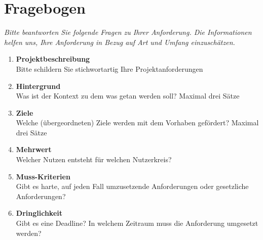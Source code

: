 \section{Fragebogen}
\textit{Bitte beantworten Sie folgende Fragen zu Ihrer Anforderung. Die Informationen helfen uns, Ihre Anforderung in Bezug auf Art und Umfang einzuschätzen. \\
}

\begin{Form}
	\begin{enumerate}

		\item \textbf{Projektbeschreibung} \\
		      Bitte schildern Sie stichwortartig Ihre Projektanforderungen  \\
		      \TextField[charsize=0pt, donotscroll, multiline, width=0.9\textwidth, height=3cm, value={}, name=description]{}

		\item \textbf{Hintergrund} \\
		      Was ist der Kontext zu dem was getan werden soll? Maximal drei Sätze \\
		      \TextField[charsize=0pt, donotscroll, multiline,width=0.9\textwidth, height=3cm, value={}, name=background ]{}

		\item \textbf{Ziele} \\
		      Welche (übergeordneten) Ziele werden mit dem Vorhaben gefördert? Maximal drei Sätze  \\
		      \TextField[charsize=0pt, donotscroll, multiline, width=0.9\textwidth , height=3cm, value={}, name=goal]{}

		\item \textbf{Mehrwert} \\
		      Welcher Nutzen entsteht für welchen Nutzerkreis? \\
		      \TextField[charsize=0pt, donotscroll, multiline, width=0.9\textwidth,  height=3cm, value={}, name=value ]{}

		\item \textbf{Muss-Kriterien} \\
		      Gibt es harte, auf jeden Fall umzusetzende Anforderungen oder gesetzliche Anforderungen?   \\
		      \TextField[charsize=0pt, donotscroll, multiline, width=0.9\textwidth,  height=3cm, value={}, name=must]{}

		      \newpage

		\item \textbf{Dringlichkeit } \\
		      Gibt es eine Deadline? In welchem Zeitraum muss die Anforderung umgesetzt werden? \\
		      \TextField[charsize=0pt, donotscroll, multiline, width=0.9\textwidth,  height=3cm, value={}, name=priority ]{}


\end{enumerate}
\end{Form}
